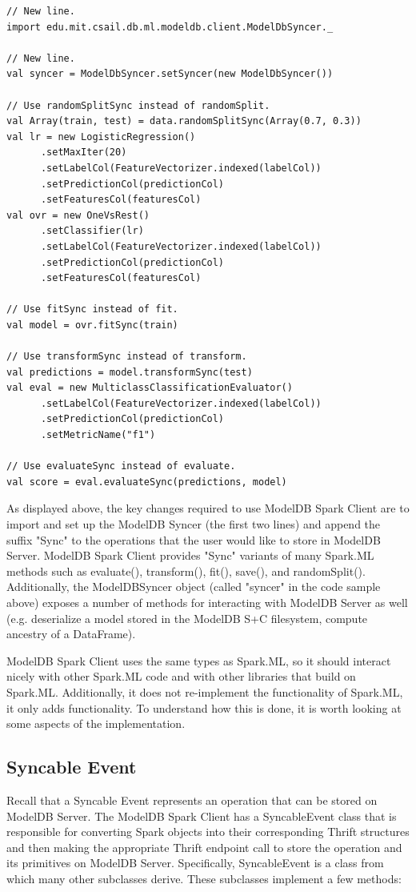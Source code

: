 \begin{verbatim}
// New line.
import edu.mit.csail.db.ml.modeldb.client.ModelDbSyncer._

// New line.
val syncer = ModelDbSyncer.setSyncer(new ModelDbSyncer())

// Use randomSplitSync instead of randomSplit.
val Array(train, test) = data.randomSplitSync(Array(0.7, 0.3))
val lr = new LogisticRegression()
      .setMaxIter(20)
      .setLabelCol(FeatureVectorizer.indexed(labelCol))
      .setPredictionCol(predictionCol)
      .setFeaturesCol(featuresCol)
val ovr = new OneVsRest()
      .setClassifier(lr)
      .setLabelCol(FeatureVectorizer.indexed(labelCol))
      .setPredictionCol(predictionCol)
      .setFeaturesCol(featuresCol)

// Use fitSync instead of fit.
val model = ovr.fitSync(train)

// Use transformSync instead of transform.
val predictions = model.transformSync(test)
val eval = new MulticlassClassificationEvaluator()
      .setLabelCol(FeatureVectorizer.indexed(labelCol))
      .setPredictionCol(predictionCol)
      .setMetricName("f1")

// Use evaluateSync instead of evaluate.
val score = eval.evaluateSync(predictions, model)
\end{verbatim}

As displayed above, the key changes required to use ModelDB Spark Client are to
import and set up the ModelDB Syncer (the first two lines) and append the suffix
"Sync" to the operations that the user would like to store in ModelDB Server. ModelDB
Spark Client provides "Sync" variants of many Spark.ML methods such as evaluate(),
transform(), fit(), save(), and randomSplit(). Additionally, the ModelDBSyncer
object (called "syncer" in the code sample above) exposes a number of methods for
interacting with ModelDB Server as well (e.g. deserialize a model stored in the ModelDB S+C
filesystem, compute ancestry of a DataFrame).

ModelDB Spark Client uses the same types as Spark.ML, so it should interact nicely
with other Spark.ML code and with other libraries that build on Spark.ML. Additionally,
it does not re-implement the functionality of Spark.ML, it only adds functionality. To
understand how this is done, it is worth looking at some aspects of the implementation.

\subsection{Syncable Event}
Recall that a Syncable Event represents an operation that can be stored on ModelDB Server.
The ModelDB Spark Client has a SyncableEvent class that is responsible for converting Spark objects
into their corresponding Thrift structures and then making the appropriate Thrift endpoint call to
store the operation and its primitives on ModelDB Server. Specifically, SyncableEvent is a class
from which many other subclasses derive. These subclasses implement a few methods:

